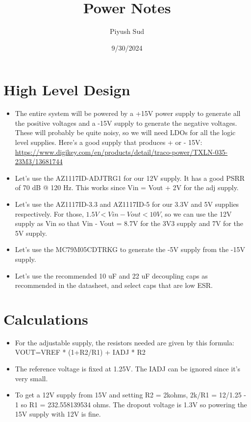 \documentclass[12pt, letterpaper]{article}
\title{Power Notes}
\author{Piyush Sud}
\date{9/30/2024}
\begin{document}
\maketitle

\pagebreak

\section{High Level Design}

\begin{itemize}
    \item The entire system will be powered by a +15V power supply to generate all the positive voltages and a -15V supply to generate the negative voltages. These will probably be quite noisy, so we will need LDOs for all the logic level supplies. Here's a good supply that produces + or - 15V: \url{https://www.digikey.com/en/products/detail/traco-power/TXLN-035-23M3/13681744}
    \item Let's use the AZ1117ID-ADJTRG1 for our 12V supply. It has a good PSRR of 70 dB @ 120 Hz. This works since Vin = Vout + 2V for the adj supply.
    \item Let's use the AZ1117ID-3.3 and AZ1117ID-5 for our 3.3V and 5V supplies respectively. For those, \(1.5V < Vin - Vout < 10V\), so we can use the 12V supply as Vin so that Vin - Vout = 8.7V for the 3V3 supply and 7V for the 5V supply. 
    \item Let's use the MC79M05CDTRKG to generate the -5V supply from the -15V supply.
    \item Let's use the recommended 10 uF and 22 uF decoupling caps as recommended in the datasheet, and select caps that are low ESR.
\end{itemize}

\section{Calculations}

\begin{itemize}
    \item For the adjustable supply, the resistors needed are given by this formula: VOUT=VREF * (1+R2/R1) + IADJ * R2
    \item The reference voltage is fixed at 1.25V. The IADJ can be ignored since it's very small.
    \item To get a 12V supply from 15V and setting R2 = 2kohms, 2k/R1 = 12/1.25 - 1 so R1 = 232.558139534 ohms. The dropout voltage is 1.3V so powering the 15V supply with 12V is fine.
\end{itemize}
\end{document}
